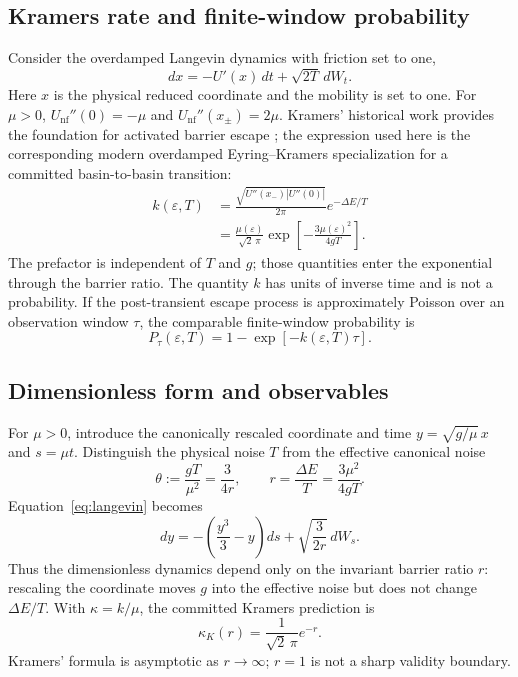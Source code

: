 \documentclass[a4paper,twocolumn,10pt]{article}
\newcommand{\eps}{\varepsilon}
\newcommand{\dE}{\Delta E}
\begin{document}
\subsection{Kramers rate and finite-window probability}
\label{sec:master}

Consider the overdamped Langevin dynamics with friction set to one,
\begin{equation}
dx=-U'(x)\,dt+\sqrt{2T}\,dW_t.
\label{eq:langevin}
\end{equation}
Here $x$ is the physical reduced coordinate and the mobility is set to one. For $\mu>0$,
$U_{\mathrm{nf}}''(0)=-\mu$ and $U_{\mathrm{nf}}''(x_\pm)=2\mu$.
Kramers' historical work provides the foundation for activated barrier escape
\citep{kramers1940brownian}; the expression used here is the corresponding modern overdamped
Eyring--Kramers specialization for a committed basin-to-basin transition:
\begin{equation}
\begin{aligned}
k(\eps,T)
&=\frac{\sqrt{U''(x_-)|U''(0)|}}{2\pi}e^{-\dE/T}\\
&=\frac{\mu(\eps)}{\sqrt2\,\pi}
\exp\!\left[-\frac{3\mu(\eps)^2}{4gT}\right].
\end{aligned}
\label{eq:kramers_full}
\end{equation}
The prefactor is independent of $T$ and $g$; those quantities enter the exponential through the
barrier ratio.
The quantity $k$ has units of inverse time and is not a probability. If the post-transient escape
process is approximately Poisson over an observation window $\tau$, the comparable finite-window
probability is
\begin{equation}
\boxed{P_\tau(\eps,T)=1-\exp[-k(\eps,T)\tau]}.
\label{eq:finite_window}
\end{equation}

\subsection{Dimensionless form and observables}

For $\mu>0$, introduce the canonically rescaled coordinate and time
$y=\sqrt{g/\mu}\,x$ and $s=\mu t$. Distinguish the physical noise $T$ from the effective
canonical noise
\begin{equation}
\theta:=\frac{gT}{\mu^2}=\frac{3}{4r},\qquad
r=\frac{\dE}{T}=\frac{3\mu^2}{4gT}.
\label{eq:r}
\end{equation}
Equation~\eqref{eq:langevin} becomes
\begin{equation}
dy=-\left(\frac{y^3}{3}-y\right)ds+\sqrt{\frac{3}{2r}}\,dW_s.
\label{eq:nondimensional_sde}
\end{equation}
Thus the dimensionless dynamics depend only on the invariant barrier ratio $r$: rescaling the
coordinate moves $g$ into the effective noise but does not change $\dE/T$. With
$\kappa=k/\mu$, the committed Kramers prediction is
\begin{equation}
\boxed{\kappa_K(r)=\frac{1}{\sqrt2\,\pi}e^{-r}}.
\label{eq:kappa_kramers}
\end{equation}
Kramers' formula is asymptotic as $r\to\infty$; $r=1$ is not a sharp validity boundary.
\end{document}
